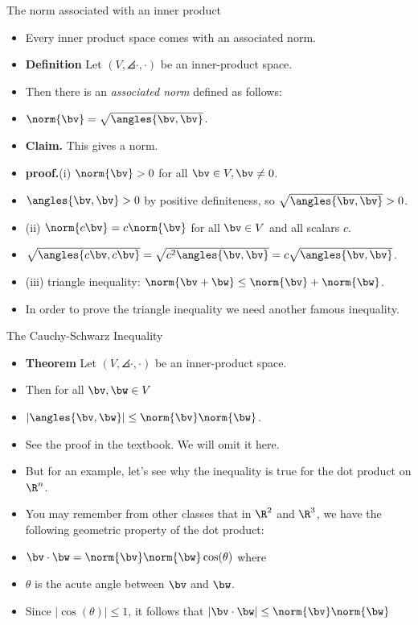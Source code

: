 \documentclass{beamer}
\begin{document}
\begin{frame}{The norm associated with an inner product}

\begin{itemize}
\item Every inner product space comes with an associated norm.
\item \textbf{Definition} Let $\left(V, \angles{\cdot,\cdot}\right)$ be an inner-product space.
\item Then there is an \emph{associated norm} defined as follows:
\item $\norm{\bv} = \sqrt{\angles{\bv,\bv}}$.
\item \textbf{Claim.} This gives a norm.
\item \textbf{proof.}(i) $\norm{\bv} > 0 $ for all $\bv\in V, \bv\not=0$.
\item $\angles{\bv,\bv} > 0$ by positive definiteness, so $\sqrt{\angles{\bv,\bv}} > 0$.
\item (ii) $\norm{c\bv} = c\norm{\bv}$ for all $\bv\in V$ and all scalars $c$.
\item $\sqrt{\angles{c\bv,c\bv}} = \sqrt{c^2 \angles{\bv,\bv}} = c\sqrt{\angles{\bv,\bv}}$.
\item (iii) triangle inequality: $\norm{\bv+\bw} \leq \norm{\bv} + \norm{\bw}$.
\item In order to prove the triangle inequality we need another famous inequality.
\end{itemize}
\end{frame}

\begin{frame}{The Cauchy-Schwarz Inequality}

\begin{itemize}
\item \textbf{Theorem}  Let $\left(V, \angles{\cdot,\cdot}\right)$ be an inner-product space.
\item Then for all $\bv,\bw\in V$
\item $|\angles{\bv,\bw}| \leq \norm{\bv} \norm{\bw}$.
\item See the proof in the textbook. We will omit it here.
\item But for an example, let's see why the inequality is true for the dot product on $\R^n$.
\item You may remember from other classes that in $\R^2$ and $\R^3$, we have the following geometric property of the dot product:
\item $\bv\cdot\bw = \norm{\bv}\norm{\bw}\cos(\theta)$ where
\item $\theta$ is the acute angle between $\bv$ and $\bw$.
\item Since $|\cos(\theta)|\leq 1$, it follows that  $|\bv\cdot\bw| \leq \norm{\bv}\norm{\bw}$
\end{itemize}
\end{frame}
\end{document}
